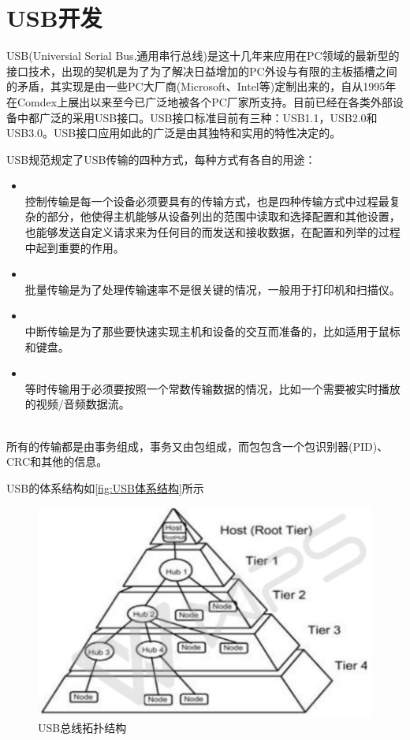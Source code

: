 \section{USB开发}
	USB(Universial Serial Bus,通用串行总线)是这十几年来应用在PC领域的最新型的接口技术，出现的契机是为了为了解决日益增加的PC外设与有限的主板插槽之间的矛盾，其实现是由一些PC大厂商(Microsoft、Intel等)定制出来的，自从1995年在Comdex上展出以来至今已广泛地被各个PC厂家所支持。目前已经在各类外部设备中都广泛的采用USB接口。USB接口标准目前有三种：USB1.1，USB2.0和USB3.0。USB接口应用如此的广泛是由其独特和实用的特性决定的。

\noindent USB规范规定了USB传输的四种方式，每种方式有各自的用途\cite{USB总线接口开发指南}：
\begin{itemize}
\item {}\\
	控制传输是每一个设备必须要具有的传输方式，也是四种传输方式中过程最复杂的部分，他使得主机能够从设备列出的范围中读取和选择配置和其他设置，也能够发送自定义请求来为任何目的而发送和接收数据，在配置和列举的过程中起到重要的作用。
\item {}\\
	批量传输是为了处理传输速率不是很关键的情况，一般用于打印机和扫描仪。
\item {}\\
	中断传输是为了那些要快速实现主机和设备的交互而准备的，比如适用于鼠标和键盘。
\item {}\\
	等时传输用于必须要按照一个常数传输数据的情况，比如一个需要被实时播放的视频/音频数据流。
\end{itemize}\\
所有的传输都是由事务组成，事务又由包组成，而包包含一个包识别器(PID)、CRC和其他的信息\cite{USB大全}。

	USB的体系结构如\autoref{fig:USB体系结构}所示
\begin{figure}[!h]
\centering
\includegraphics[width=1.0\textwidth]{./graphics/usb-structure.pdf}
\caption{USB总线拓扑结构}\label{fig:USB体系结构}
\end{figure}

